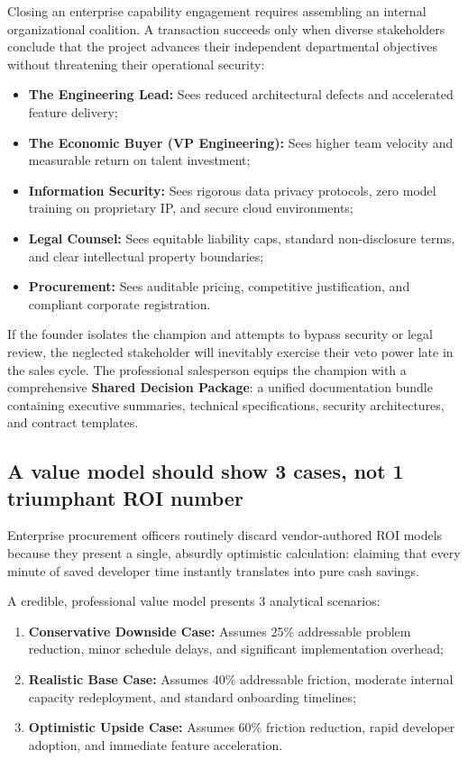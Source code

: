Closing an enterprise capability engagement requires assembling an internal organizational coalition. A transaction succeeds only when diverse stakeholders conclude that the project advances their independent departmental objectives without threatening their operational security:
\begin{itemize}
\item \textbf{The Engineering Lead:} Sees reduced architectural defects and accelerated feature delivery;
\item \textbf{The Economic Buyer (VP Engineering):} Sees higher team velocity and measurable return on talent investment;
\item \textbf{Information Security:} Sees rigorous data privacy protocols, zero model training on proprietary IP, and secure cloud environments;
\item \textbf{Legal Counsel:} Sees equitable liability caps, standard non-disclosure terms, and clear intellectual property boundaries;
\item \textbf{Procurement:} Sees auditable pricing, competitive justification, and compliant corporate registration.
\end{itemize}
If the founder isolates the champion and attempts to bypass security or legal review, the neglected stakeholder will inevitably exercise their veto power late in the sales cycle. The professional salesperson equips the champion with a comprehensive \textbf{Shared Decision Package}: a unified documentation bundle containing executive summaries, technical specifications, security architectures, and contract templates.

\subsection{A value model should show 3 cases, not 1 triumphant ROI number}

Enterprise procurement officers routinely discard vendor-authored ROI models because they present a single, absurdly optimistic calculation: claiming that every minute of saved developer time instantly translates into pure cash savings.

A credible, professional value model presents 3 analytical scenarios:
\begin{enumerate}
\item \textbf{Conservative Downside Case:} Assumes 25\% addressable problem reduction, minor schedule delays, and significant implementation overhead;
\item \textbf{Realistic Base Case:} Assumes 40\% addressable friction, moderate internal capacity redeployment, and standard onboarding timelines;
\item \textbf{Optimistic Upside Case:} Assumes 60\% friction reduction, rapid developer adoption, and immediate feature acceleration.
\end{enumerate}

